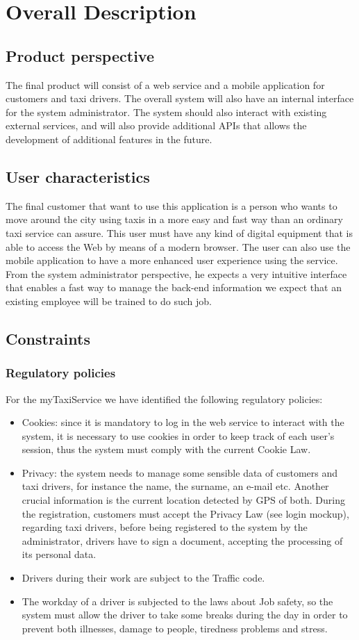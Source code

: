 \documentclass[a4paper,12pt]{article}%
\begin{document}
\section{Overall Description}
\subsection{Product perspective}
The final product will consist of a web service and a mobile application for customers and taxi drivers.
The overall system will also have an internal interface for the system administrator. The system should also interact with existing external services, and will also provide additional APIs that allows the development of additional features in the future. 
\subsection{User characteristics}
The final customer that want to use this application is a person who wants to move around the city using taxis in a more easy and fast way than an ordinary taxi service can assure. This user must have any kind of digital equipment that is able to access the Web by means of a modern browser. The user can also use the mobile application to have a more enhanced user experience using the service.
From the system administrator perspective, he expects a very intuitive interface that enables a fast way to manage the back-end information we expect that an existing employee will be trained to do such job.
\subsection{Constraints}
\subsubsection{Regulatory policies}
For the myTaxiService we have identified the following regulatory policies:
\begin{itemize}
\item Cookies: since it is mandatory to log in the web service to interact with the system, it is necessary to use cookies in order to keep track of each user's session, thus the system must comply with the current Cookie Law.
\item Privacy: the system needs to manage some sensible data of customers and taxi drivers, for instance the name, the surname, an e-mail etc. Another crucial information is the current location detected by GPS of both. During the registration, customers must accept the Privacy Law (see login mockup), regarding taxi drivers, before being registered to the system by the administrator, drivers have to sign a document, accepting the processing of its personal data.
\item Drivers during their work are subject to the Traffic code.
\item The workday of a driver is subjected to the laws about Job safety, so the system must allow the driver to take some breaks during the day in order to prevent both illnesses, damage to people, tiredness problems and stress.
\end{itemize}
\end{document}

